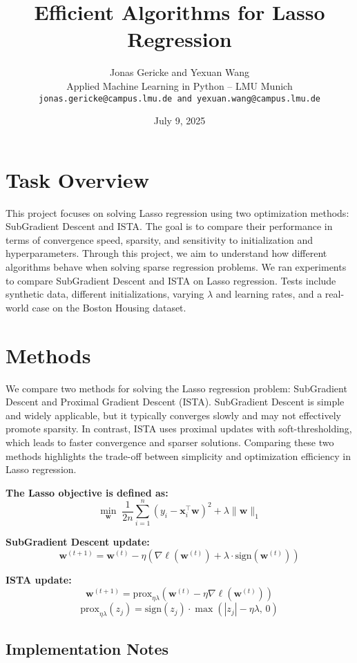 \documentclass[11pt]{article}
\title{\textbf{Efficient Algorithms for Lasso Regression}}
\author{Jonas Gericke and Yexuan Wang \\
Applied Machine Learning in Python -- LMU Munich \\
\texttt{jonas.gericke@campus.lmu.de and yexuan.wang@campus.lmu.de}}
\date{July 9, 2025}
\begin{document}
\maketitle

\section{Task Overview}

This project focuses on solving Lasso regression using two optimization methods: SubGradient Descent and ISTA. The goal is to compare their performance in terms of convergence speed, sparsity, and sensitivity to initialization and hyperparameters.
Through this project, we aim to understand how different algorithms behave when solving sparse regression problems.
We ran experiments to compare SubGradient Descent and ISTA on Lasso regression. Tests include synthetic data, different initializations, varying \(\lambda\) and learning rates, and a real-world case on the Boston Housing dataset.

\section{Methods}

We compare two methods for solving the Lasso regression problem: SubGradient Descent and Proximal Gradient Descent (ISTA). 
SubGradient Descent is simple and widely applicable, but it typically converges slowly and may not effectively promote sparsity. In contrast, ISTA uses proximal updates with soft-thresholding, which leads to faster convergence and sparser solutions. Comparing these two methods highlights the trade-off between simplicity and optimization efficiency in Lasso regression.

\noindent\textbf{The Lasso objective is defined as:}
\[
\min_{\mathbf{w}} \; \frac{1}{2n} \sum_{i=1}^n (y_i - \mathbf{x}_i^\top \mathbf{w})^2 + \lambda \|\mathbf{w}\|_1
\]

\noindent\textbf{SubGradient Descent update:}
\[
\mathbf{w}^{(t+1)} = \mathbf{w}^{(t)} - \eta \left( \nabla \ell(\mathbf{w}^{(t)}) + \lambda \cdot \text{sign}(\mathbf{w}^{(t)}) \right)
\]

\noindent\textbf{ISTA update:}
\[
\mathbf{w}^{(t+1)} = \text{prox}_{\eta \lambda} \left( \mathbf{w}^{(t)} - \eta \nabla \ell(\mathbf{w}^{(t)}) \right)
\]
\[
\text{prox}_{\eta \lambda}(z_j) = \text{sign}(z_j) \cdot \max\left( |z_j| - \eta \lambda, \, 0 \right)
\]


\subsection*{Implementation Notes}
\end{document}
